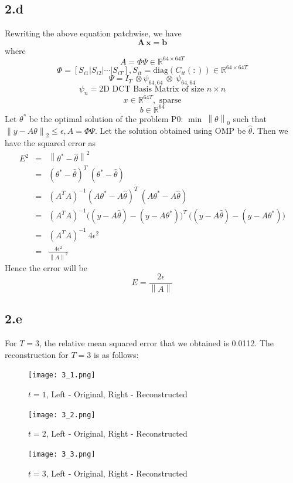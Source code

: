 \documentclass[12pt]{article}
\begin{document}
\subsection*{2.d}
Rewriting the above equation patchwise, we have
$$\mathbf{A\,x = b}$$
where
$$A = \Phi \Psi \in \mathbb{R}^{64\times 64T}$$
$$\Phi = [S_{i1}|S_{i2}|\cdots|S_{iT}], S_{it} = \text{diag}(C_{it}(:)) \in \mathbb{R}^{64 \times 64T}$$
$$\Psi = I_{T} \:\otimes \psi_{64,64} \: \otimes\: \psi_{64,64}$$
$$\psi_n = \text{2D DCT Basis Matrix of size } n \times n$$
$$x \in \mathbb{R}^{64T}, \text{ sparse}$$
$$b \in \mathbb{R}^{64}$$
Let $\theta^*$ be the optimal solution of the problem P0: $\min \: \left\lVert\theta\right\rVert_0$ such that $\left \lVert y - A \theta\right \rVert_2 \leq \epsilon, A = \Phi \Psi$.
Let the solution obtained using OMP be $\hat{\theta}$. Then we have the squared error as
\begin{eqnarray*}
E^2 &=& \left \lVert \theta^* - \hat{\theta}\right \rVert^2\\
&=& (\theta^* - \hat{\theta})^T\: (\theta^* - \hat{\theta})\\
&=& (A^TA)^{-1} (A\theta^* - A\hat{\theta})^T \: (A\theta^* - A\hat{\theta})\\
&=& (A^TA)^{-1} \bigg((y - A\hat{\theta}) - (y - A\theta^*)\bigg)^T\: \bigg((y - A\hat{\theta}) - (y - A\theta^*)\bigg)\\
&=& (A^TA)^{-1}\: 4\epsilon^2\\
&=& \frac{4\epsilon^2}{\left\lVert A \right \rVert^2}
\end{eqnarray*}
Hence the error will be
$$E = \frac{2\epsilon}{\left\lVert A \right \rVert}$$
\subsection*{2.e}
For $T=3$, the relative mean squared error that we obtained is 0.0112.
The reconstruction for $T=3$ is as follows:
\begin{figure}[ht]
	\centering
	\texttt{[image: 3\_1.png]}
	\caption{$t = 1$, Left - Original, Right - Reconstructed}
\end{figure}
\begin{figure}[ht]
	\centering
	\texttt{[image: 3\_2.png]}
	\caption{$t = 2$, Left - Original, Right - Reconstructed}
\end{figure}
\newpage
\begin{figure}[ht]
	\centering
	\texttt{[image: 3\_3.png]}
	\caption{$t = 3$, Left - Original, Right - Reconstructed}
\end{figure}
\end{document}
